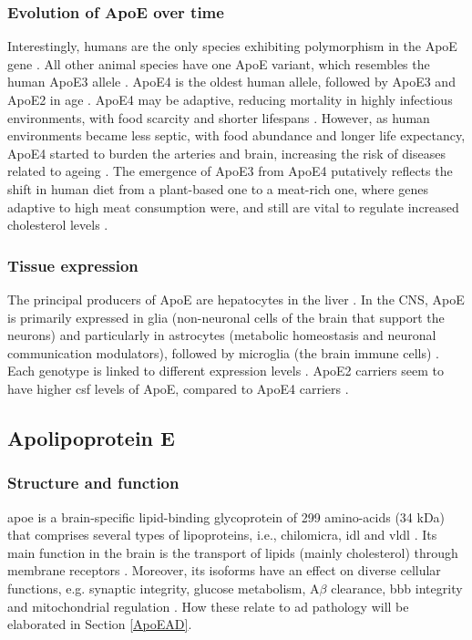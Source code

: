 \documentclass{amsart}
\begin{document}
\subsubsection*{Evolution of ApoE over time}
Interestingly, humans are the only species exhibiting polymorphism in the ApoE gene \cite{Yassine2020APOEDisease}. All other animal species have one ApoE variant, which resembles the human ApoE3 allele \cite{Hunsberger2019TheInterventions}. ApoE4 is the oldest human allele, followed by ApoE3 and ApoE2 in age \cite{Yassine2020APOEDisease}. ApoE4 may be adaptive, reducing mortality in highly infectious environments, with food scarcity and shorter lifespans \cite{Trumble2017ApolipoproteinBurden}. However, as human environments became less septic, with food abundance and longer life expectancy, ApoE4 started to burden the arteries and brain, increasing the risk of diseases related to ageing \cite{Yassine2020APOEDisease}. The emergence of ApoE3 from ApoE4 putatively reflects the shift in human diet from a plant-based one to a meat-rich one, where genes adaptive to high meat consumption were, and still are vital to regulate increased cholesterol levels \cite{Finch1999TheIsoforms}. 

\subsubsection*{Tissue expression}
The principal producers of ApoE are hepatocytes in the liver \cite{Mahley2016CentralMetabolism}. In the CNS, ApoE is primarily expressed in glia (non-neuronal cells of the brain that support the neurons) and particularly in astrocytes (metabolic homeostasis and neuronal communication modulators), followed by microglia (the brain immune cells) \cite{Lanfranco2021ExpressionInflammation}. Each genotype is linked to different expression levels \cite{Husain2021APOETherapeutics}. ApoE2 carriers seem to have higher \acrfull{csf} levels of ApoE, compared to ApoE4 carriers \cite{Castellano2011HumanClearance, Cruchaga2012CerebrospinalDisease}. 

\subsection{Apolipoprotein E}\label{ApoEprot}
\subsubsection*{Structure and function}
\acrshort{apoe} is a brain-specific lipid-binding glycoprotein of 299 amino-acids (34 kDa) that comprises several types of lipoproteins, i.e., chilomicra, \acrlong{idl} and \acrlong{vldl} \cite{Husain2021APOETherapeutics}. Its main function in the brain is the transport of lipids (mainly cholesterol) through membrane receptors \cite{Yang2023ApolipoproteinDisease}. Moreover, its isoforms have an effect on diverse cellular functions, e.g. synaptic integrity, glucose metabolism, A$\beta$ clearance, \acrlong{bbb} integrity and mitochondrial regulation \cite{Husain2021APOETherapeutics}. How these relate to \acrshort{ad} pathology will be elaborated in Section \ref{ApoEAD}.
\end{document}
